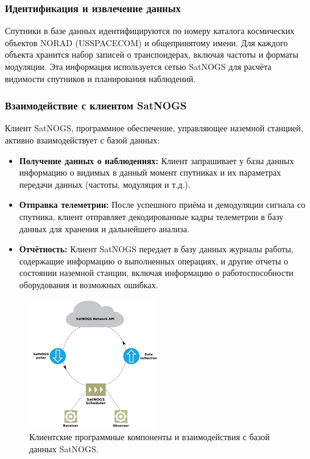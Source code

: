 \documentclass[12pt, a4paper]{extreport}
\begin{document}
\subsubsection{Идентификация и извлечение данных}

Спутники в базе данных идентифицируются по номеру каталога космических объектов NORAD (USSPACECOM) и общепринятому имени. Для каждого объекта хранится набор записей о транспондерах, включая частоты и форматы модуляции. Эта информация используется сетью SatNOGS для расчёта видимости спутников и планирования наблюдений.

\subsubsection{Взаимодействие с клиентом SatNOGS}

Клиент SatNOGS, программное обеспечение, управляющее наземной станцией, активно взаимодействует с базой данных:

\begin{itemize}
    \item \textbf{Получение данных о наблюдениях:} Клиент запрашивает у базы данных информацию о видимых в данный момент спутниках и их параметрах передачи данных (частоты, модуляция и т.д.).
    \item \textbf{Отправка телеметрии:} После успешного приёма и демодуляции сигнала со спутника, клиент отправляет декодированные кадры телеметрии в базу данных для хранения и дальнейшего анализа.
    \item \textbf{Отчётность:} Клиент SatNOGS передает в базу данных журналы работы, содержащие информацию о выполненных операциях,  и другие отчеты о состоянии наземной станции, включая информацию о работоспособности оборудования и возможных ошибках.
\end{itemize}

\begin{figure}[h!]
    \centering
    \includegraphics[width=0.5\textwidth]{satnogs_client_program_interactions.png}
    \caption{Клиентские программные компоненты и взаимодействия с базой данных SatNOGS.}
    \label{fig:satnogs_client_program_interactions}
\end{figure}
\end{document}
